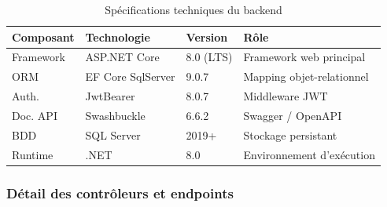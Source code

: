\begin{table}[H]
\centering
\caption{Spécifications techniques du backend}
\label{tab:stack_backend}
\begin{tabular}{@{} l l l p{5cm} @{}}
\toprule
\textbf{Composant} & \textbf{Technologie} & \textbf{Version} & \textbf{Rôle} \\
\midrule
Framework & ASP.NET Core & 8.0 (LTS) & Framework web principal \\
ORM & EF Core SqlServer & 9.0.7 & Mapping objet-relationnel \\
Auth. & JwtBearer & 8.0.7 & Middleware JWT \\
Doc. API & Swashbuckle & 6.6.2 & Swagger / OpenAPI \\
BDD & SQL Server & 2019+ & Stockage persistant \\
Runtime & .NET & 8.0 & Environnement d'exécution \\
\bottomrule
\end{tabular}
\end{table}

\subsubsection{Détail des contrôleurs et endpoints}

